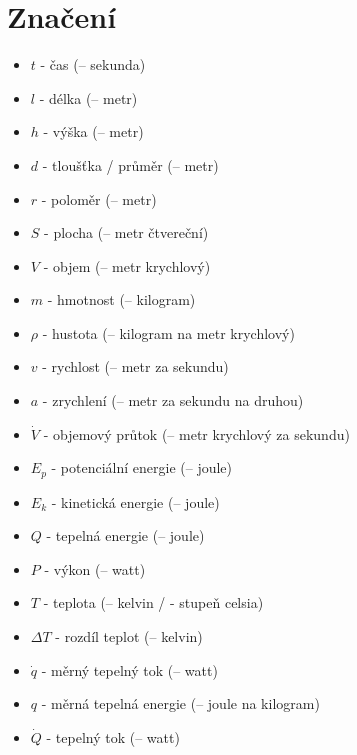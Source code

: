 \documentclass{article}
\begin{document}
\maketitle
\tableofcontents
\newpage



\section{Značení}

\begin{itemize}
    \item $t$ - čas (\ueqS \fs -- sekunda)
    \item $l$ - délka (\ueqM \fs -- metr)
    \item $h$ - výška (\ueqM \fs -- metr)
    \item $d$ - tloušťka / průměr (\ueqM \fs -- metr)
    \item $r$ - poloměr (\ueqM \fs -- metr)
    \item $S$ - plocha (\ueqMsq \fs -- metr čtvereční)
    \item $V$ - objem (\ueqMcu \fs -- metr krychlový)
    \item $m$ - hmotnost (\ueqKG \fs -- kilogram)
    \item $\rho$ - hustota (\ueqKGandMinvcu \fs -- kilogram na metr krychlový)
    \item $v$ - rychlost (\ueqMandSinv \fs -- metr za sekundu)
    \item $a$ - zrychlení (\ueqMandSinvsq \fs -- metr za sekundu na druhou)
    \item $\dot{V}$ - objemový průtok (\ueqMcuSinv \fs -- metr krychlový za sekundu)
    \item $E_p$ - potenciální energie (\ueqJ \fs -- joule)
    \item $E_k$ - kinetická energie (\ueqJ \fs -- joule)
    \item $Q$ - tepelná energie (\ueqJ \fs -- joule)
    \item $P$ - výkon (\ueqW \fs -- watt)
    \item $T$ - teplota (\ueqK \fs -- kelvin / \ueqCELS \fs - stupeň celsia)
    \item $\Delta T$ - rozdíl teplot (\ueqK \fs -- kelvin)
    \item $\dot{q}$ - měrný tepelný tok (\ueqWandMinvsq \fs -- watt)
    \item $q$ - měrná tepelná energie (\ueqJandMinvsq \fs -- joule na kilogram)
    \item $\dot{Q}$ - tepelný tok (\ueqW \fs -- watt)

\end{itemize}
\end{document}

